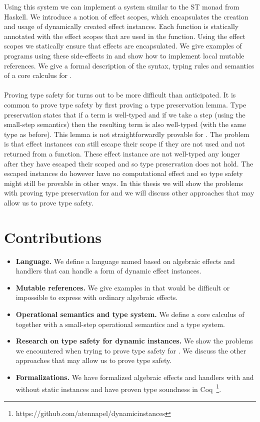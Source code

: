 Using this system we can implement a system similar to the ST monad from Haskell.
We introduce a notion of effect scopes, which encapsulates the creation and usage of dynamically created effect instances.
Each function is statically annotated with the effect scopes that are used in the function.
Using the effect scopes we statically ensure that effects are encapsulated.
We give examples of programs using these side-effects in \lang{} and show how to implement local mutable references.
We give a formal description of the syntax, typing rules and semantics of a core calculus for \lang{}.
\\\\
Proving type safety for \lang{} turns out to be more difficult than anticipated.
It is common to prove type safety by first proving a type preservation lemma.
Type preservation states that if a term is well-typed and if we take a step (using the small-step semantics) then the resulting term is also well-typed (with the same type as before).
This lemma is not straightforwardly provable for \lang{}.
The problem is that effect instances can still escape their scope if they are not used and not returned from a function.
These effect instance are not well-typed any longer after they have escaped their scoped and so type preservation does not hold.
The escaped instances do however have no computational effect and so type safety might still be provable in other ways.
In this thesis we will show the problems with proving type preservation for \lang{} and we will discuss other approaches that may allow us to prove type safety.

\section*{Contributions}
\begin{itemize}

\item \textbf{Language.}
We define a language named \lang{} based on algebraic effects and handlers that can handle a form of dynamic effect instances.

\item \textbf{Mutable references.}
We give examples in \lang{} that would be difficult or impossible to express with ordinary algebraic effects.

\item \textbf{Operational semantics and type system.}
We define a core calculus of \lang{} together with a small-step operational semantics and a type system.

\item \textbf{Research on type safety for dynamic instances.}
We show the problems we encountered when trying to prove type safety for \lang{}.
We discuss the other approaches that may allow us to prove type safety.

\item \textbf{Formalizations.}
We have formalized algebraic effects and handlers with and without static instances and have proven type soundness in Coq~\footnote{https://github.com/atennapel/dynamicinstances}.

\end{itemize}

